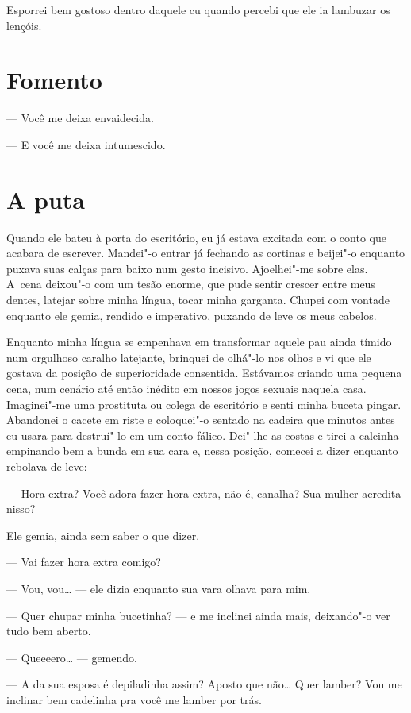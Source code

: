 Esporrei bem gostoso dentro daquele cu quando percebi que ele ia lambuzar os
lençóis.

\chapter{Fomento}

\mbox{}\indent{}--- Você me deixa envaidecida.

--- E você me deixa intumescido.

\chapter{A puta}

Quando ele bateu à porta do escritório, eu já estava excitada com o
conto que acabara de escrever. Mandei"-o entrar já fechando as cortinas e
beijei"-o enquanto puxava suas calças para baixo num gesto incisivo.
Ajoelhei"-me sobre elas. A~cena deixou"-o com um tesão enorme, que pude
sentir crescer entre meus dentes, latejar sobre minha língua, tocar
minha garganta. Chupei com vontade enquanto ele gemia, rendido e
imperativo, puxando de leve os meus cabelos.

Enquanto minha língua se empenhava em transformar aquele pau ainda
tímido num orgulhoso caralho latejante, brinquei de olhá"-lo nos olhos e
vi que ele gostava da posição de superioridade consentida. Estávamos
criando uma pequena cena, num cenário até então inédito em nossos jogos
sexuais naquela casa. Imaginei"-me uma prostituta ou colega de escritório
e senti minha buceta pingar. Abandonei o cacete em riste e coloquei"-o
sentado na cadeira que minutos antes eu usara para destruí"-lo em um
conto fálico. Dei"-lhe as costas e tirei a calcinha empinando bem a bunda
em sua cara e, nessa posição, comecei a dizer enquanto rebolava de leve:

--- Hora extra? Você adora fazer hora extra, não é, canalha? Sua mulher
acredita nisso?

Ele gemia, ainda sem saber o que dizer.

--- Vai fazer hora extra comigo?

--- Vou, vou… --- ele dizia enquanto sua vara olhava para mim.

--- Quer chupar minha bucetinha? --- e me inclinei ainda mais,
deixando"-o ver tudo bem aberto.

--- Queeeero… --- gemendo.

--- A da sua esposa é depiladinha assim? Aposto que não… Quer
lamber? Vou me inclinar bem cadelinha pra você me lamber por trás.


